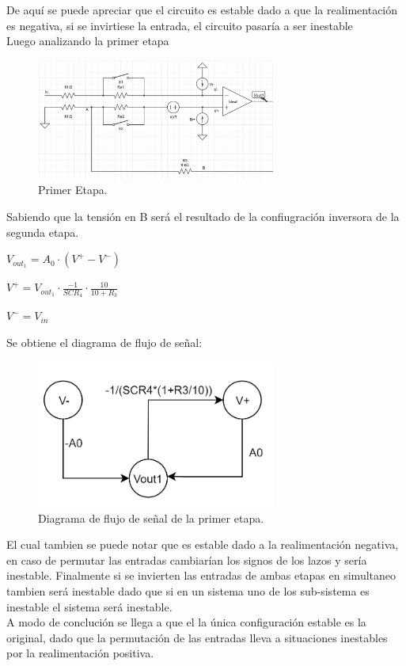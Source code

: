 De aquí se puede apreciar que el circuito es estable dado a que la realimentación es negativa, si se invirtiese la entrada, el circuito pasaría a ser inestable\\
Luego analizando la primer etapa
\begin{figure}[H]	
	\centering
	\includegraphics[width=0.7\textwidth]{imagenes/PrimeraEtapa.PNG}
	\caption{Primer Etapa.}
	\label{fig:PrimerEtapa}
\end{figure}
Sabiendo que la tensión en B será el resultado de la confiugración inversora de la segunda etapa.\\
\begin{center}$V_{out_1}=A_0 \cdot (V^+ - V^-)$\\\end{center}
\begin{center}$V^+= V_{out_1}\cdot \frac{-1}{SCR_4} \cdot \frac{10}{10+R_3} $\\\end{center}
\begin{center}$V^- = V_{in}$\\\end{center}
Se obtiene el diagrama de flujo de señal:
\begin{figure}[H]	
	\centering
	\includegraphics[width=0.7\textwidth]{imagenes/PrimerEtapaDiagrama.PNG}
	\caption{Diagrama de flujo de señal de la primer etapa.}
	\label{fig:PrimerEtapaDiagrama}
\end{figure}
El cual tambien se puede notar que es estable dado a la realimentación negativa, en caso de permutar las entradas cambiarían los signos de los lazos y sería inestable.
Finalmente si se invierten las entradas de ambas etapas en simultaneo tambien será inestable dado que si en un sistema uno de los sub-sistema es inestable el sistema será inestable.\\
A modo de conclución se llega a que el la única configuración estable es la original, dado que la permutación de las entradas lleva a situaciones inestables por la realimentación positiva.
